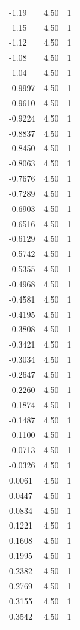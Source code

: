 \begin{longtable}{lrr}
  -1.19 & 4.50 & 1 \\
  -1.15 & 4.50 & 1 \\
  -1.12 & 4.50 & 1 \\
  -1.08 & 4.50 & 1 \\
  -1.04 & 4.50 & 1 \\
  -0.9997 & 4.50 & 1 \\
  -0.9610 & 4.50 & 1 \\
  -0.9224 & 4.50 & 1 \\
  -0.8837 & 4.50 & 1 \\
  -0.8450 & 4.50 & 1 \\
  -0.8063 & 4.50 & 1 \\
  -0.7676 & 4.50 & 1 \\
  -0.7289 & 4.50 & 1 \\
  -0.6903 & 4.50 & 1 \\
  -0.6516 & 4.50 & 1 \\
  -0.6129 & 4.50 & 1 \\
  -0.5742 & 4.50 & 1 \\
  -0.5355 & 4.50 & 1 \\
  -0.4968 & 4.50 & 1 \\
  -0.4581 & 4.50 & 1 \\
  -0.4195 & 4.50 & 1 \\
  -0.3808 & 4.50 & 1 \\
  -0.3421 & 4.50 & 1 \\
  -0.3034 & 4.50 & 1 \\
  -0.2647 & 4.50 & 1 \\
  -0.2260 & 4.50 & 1 \\
  -0.1874 & 4.50 & 1 \\
  -0.1487 & 4.50 & 1 \\
  -0.1100 & 4.50 & 1 \\
  -0.0713 & 4.50 & 1 \\
  -0.0326 & 4.50 & 1 \\
  0.0061 & 4.50 & 1 \\
  0.0447 & 4.50 & 1 \\
  0.0834 & 4.50 & 1 \\
  0.1221 & 4.50 & 1 \\
  0.1608 & 4.50 & 1 \\
  0.1995 & 4.50 & 1 \\
  0.2382 & 4.50 & 1 \\
  0.2769 & 4.50 & 1 \\
  0.3155 & 4.50 & 1 \\
  0.3542 & 4.50 & 1 \\

\end{longtable}
